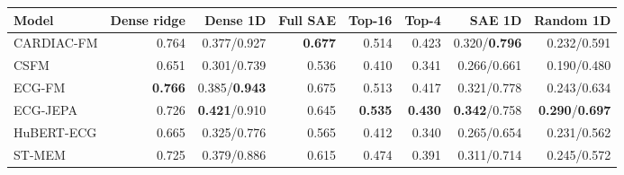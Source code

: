 \begin{tabular}{lrrrrrrr}
\toprule
Model & Dense ridge & Dense 1D & Full SAE & Top-16 & Top-4 & SAE 1D & Random 1D \\
\midrule
CARDIAC-FM & 0.764 & 0.377/0.927 & \textbf{0.677} & 0.514 & 0.423 & 0.320/\textbf{0.796} & 0.232/0.591 \\
CSFM & 0.651 & 0.301/0.739 & 0.536 & 0.410 & 0.341 & 0.266/0.661 & 0.190/0.480 \\
ECG-FM & \textbf{0.766} & 0.385/\textbf{0.943} & 0.675 & 0.513 & 0.417 & 0.321/0.778 & 0.243/0.634 \\
ECG-JEPA & 0.726 & \textbf{0.421}/0.910 & 0.645 & \textbf{0.535} & \textbf{0.430} & \textbf{0.342}/0.758 & \textbf{0.290}/\textbf{0.697} \\
HuBERT-ECG & 0.665 & 0.325/0.776 & 0.565 & 0.412 & 0.340 & 0.265/0.654 & 0.231/0.562 \\
ST-MEM & 0.725 & 0.379/0.886 & 0.615 & 0.474 & 0.391 & 0.311/0.714 & 0.245/0.572 \\
\bottomrule
\end{tabular}
